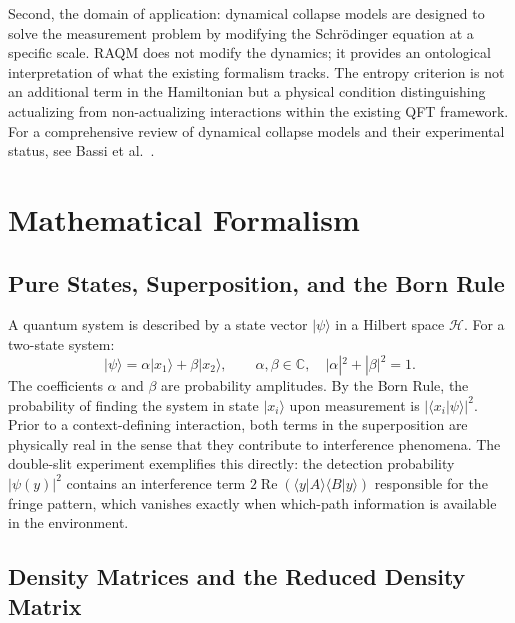\documentclass[11pt,a4paper]{article}
\theoremstyle{plain}
\theoremstyle{definition}
\theoremstyle{remark}
\newcommand{\ket}[1]{|#1\rangle}
\newcommand{\braket}[2]{\langle #1 | #2 \rangle}
\begin{document}
Second, the domain of application: dynamical collapse models are designed to solve
the measurement problem by modifying the Schr\"{o}dinger equation at a specific
scale. RAQM does not modify the dynamics; it provides an ontological
interpretation of what the existing formalism tracks. The entropy criterion is not
an additional term in the Hamiltonian but a physical condition distinguishing
actualizing from non-actualizing interactions within the existing QFT framework.
For a comprehensive review of dynamical collapse models and their experimental
status, see Bassi et al.\ \citep{Bassi2013}.

\section{Mathematical Formalism}
\label{sec:formalism}

\subsection{Pure States, Superposition, and the Born Rule}

A quantum system is described by a state vector $\ket{\psi}$ in a Hilbert space
$\mathcal{H}$. For a two-state system:
\begin{equation}
  \ket{\psi} = \alpha\ket{x_1} + \beta\ket{x_2},\qquad
  \alpha,\beta \in \mathbb{C},\quad |\alpha|^2 + |\beta|^2 = 1.
\end{equation}
The coefficients $\alpha$ and $\beta$ are probability amplitudes. By the Born
Rule, the probability of finding the system in state $\ket{x_i}$ upon measurement
is $|\braket{x_i}{\psi}|^2$. Prior to a context-defining interaction, both terms
in the superposition are physically real in the sense that they contribute to
interference phenomena. The double-slit experiment exemplifies this directly: the
detection probability $|\psi(y)|^2$ contains an interference term
$2\operatorname{Re}(\braket{y}{A}\braket{B}{y})$ responsible for the fringe
pattern, which vanishes exactly when which-path information is available in the
environment.

\subsection{Density Matrices and the Reduced Density Matrix}
\end{document}
